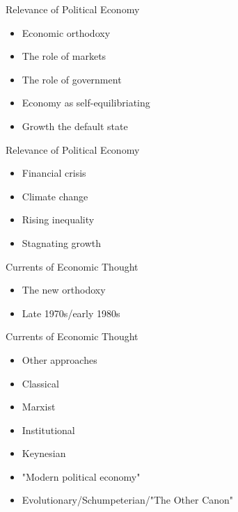 \documentclass[10pt, show notes]{beamer}
\begin{document}
\begin{frame}{Relevance of Political Economy}
\begin{itemize}[<+- | alert@+>]
	\item \alert<6>{Economic orthodoxy}
	\item The role of markets
	\item The role of government
	\item Economy as self-equilibriating
	\item Growth the default state
\end{itemize}
\end{frame}

\begin{frame}{Relevance of Political Economy}
\begin{itemize}[<+- | alert@+>]
	\item Financial crisis
	\item Climate change
	\item Rising inequality
	\item Stagnating growth
\end{itemize}
\end{frame}

\begin{frame}{Currents of Economic Thought}
\begin{itemize}[<+- | alert@+>]
	\item The new orthodoxy
	\item Late 1970s/early 1980s \only<6>{-Chicago School}
\end{itemize}
\end{frame}

\begin{frame}{Currents of Economic Thought}
\begin{itemize}[<+- | alert@+>]
	\item Other approaches
	\item Classical
	\item Marxist
	\item Institutional
	\item Keynesian
	\item "Modern political economy"
	\item Evolutionary/Schumpeterian/"The Other Canon"
\end{itemize}
\end{frame}
\end{document}
